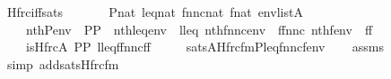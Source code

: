 \begin{isabellebody}
\endisatagproof
{\isafoldproof}%
%
\isadelimproof
\isanewline
%
\endisadelimproof
\isanewline
{}\isamarkupfalse%
\ Hfrc{\isacharunderscore}{\kern0pt}iff{\isacharunderscore}{\kern0pt}sats{\isacharcolon}{\kern0pt}\isanewline
\ \ \isanewline
\ \ \ \ {\isachardoublequoteopen}P{\isasymin}nat{\isachardoublequoteclose}\ {\isachardoublequoteopen}leq{\isasymin}nat{\isachardoublequoteclose}\ {\isachardoublequoteopen}fnnc{\isasymin}nat{\isachardoublequoteclose}\ {\isachardoublequoteopen}f{\isasymin}nat{\isachardoublequoteclose}\ {\isachardoublequoteopen}env{\isasymin}list{\isacharparenleft}{\kern0pt}A{\isacharparenright}{\kern0pt}{\isachardoublequoteclose}\isanewline
\ \ \ \ {\isachardoublequoteopen}nth{\isacharparenleft}{\kern0pt}P{\isacharcomma}{\kern0pt}env{\isacharparenright}{\kern0pt}\ {\isacharequal}{\kern0pt}\ PP{\isachardoublequoteclose}\ \ {\isachardoublequoteopen}nth{\isacharparenleft}{\kern0pt}leq{\isacharcomma}{\kern0pt}env{\isacharparenright}{\kern0pt}\ {\isacharequal}{\kern0pt}\ lleq{\isachardoublequoteclose}\ {\isachardoublequoteopen}nth{\isacharparenleft}{\kern0pt}fnnc{\isacharcomma}{\kern0pt}env{\isacharparenright}{\kern0pt}\ {\isacharequal}{\kern0pt}\ ffnnc{\isachardoublequoteclose}\ {\isachardoublequoteopen}nth{\isacharparenleft}{\kern0pt}f{\isacharcomma}{\kern0pt}env{\isacharparenright}{\kern0pt}\ {\isacharequal}{\kern0pt}\ ff{\isachardoublequoteclose}\isanewline
\ \ \isanewline
\ \ \ \ {\isachardoublequoteopen}is{\isacharunderscore}{\kern0pt}Hfrc{\isacharparenleft}{\kern0pt}{\isacharhash}{\kern0pt}{\isacharhash}{\kern0pt}A{\isacharcomma}{\kern0pt}\ PP{\isacharcomma}{\kern0pt}\ lleq{\isacharcomma}{\kern0pt}ffnnc{\isacharcomma}{\kern0pt}ff{\isacharparenright}{\kern0pt}\isanewline
\ \ \ \ {\isasymlongleftrightarrow}\ sats{\isacharparenleft}{\kern0pt}A{\isacharcomma}{\kern0pt}Hfrc{\isacharunderscore}{\kern0pt}fm{\isacharparenleft}{\kern0pt}P{\isacharcomma}{\kern0pt}leq{\isacharcomma}{\kern0pt}fnnc{\isacharcomma}{\kern0pt}f{\isacharparenright}{\kern0pt}{\isacharcomma}{\kern0pt}env{\isacharparenright}{\kern0pt}{\isachardoublequoteclose}\isanewline
%
\isadelimproof
\ \ %
\endisadelimproof
%
\isatagproof
{}\isamarkupfalse%
\ assms\isanewline
\ \ \isamarkupfalse%
\ {\isacharparenleft}{\kern0pt}simp\ add{\isacharcolon}{\kern0pt}sats{\isacharunderscore}{\kern0pt}Hfrc{\isacharunderscore}{\kern0pt}fm{\isacharparenright}{\kern0pt}%
\endisatagproof
{\isafoldproof}%
%
\isadelimproof
\isanewline
%
\endisadelimproof
\isanewline
{}\isamarkupfalse%
\isanewline

\end{isabellebody}
